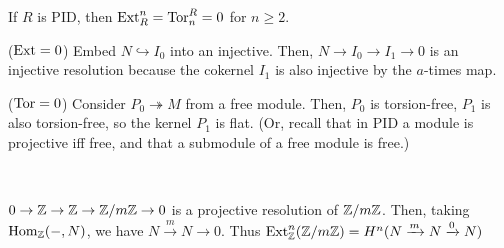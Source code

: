 \documentclass{../../small}
\begin{document}
\begin{prop*}[2.4.8]
If $R$ is PID, then $\operatorname{Ext}_R^n=\operatorname{Tor}^R_n=0$ for $n\ge2$.
\end{prop*}
\begin{pf}
($\operatorname{Ext}=0$)
Embed $N\hookrightarrow I_0$ into an injective.
Then, $N\to I_0\to I_1\to0$ is an injective resolution because the cokernel $I_1$ is also injective by the $a$-times map.

($\operatorname{Tor}=0$)
Consider $P_0\twoheadrightarrow M$ from a free module.
Then, $P_0$ is torsion-free, $P_1$ is also torsion-free, so the kernel $P_1$ is flat.
(Or, recall that in PID a module is projective iff free, and that a submodule of a free module is free.)
\end{pf}
\begin{ex*}\,
\begin{parts}
\item $0\to\mathbb{Z}\to\mathbb{Z}\to\mathbb{Z}/m\mathbb{Z}\to0$ is a projective resolution of $\mathbb{Z}/m\mathbb{Z}$.
Then, taking $\operatorname{Hom}_{\mathbb{Z}}(-,N)$, we have $N\xrightarrow{m}N\to0$.
Thus $\operatorname{Ext}_{\mathbb{Z}}^n(\mathbb{Z}/m\mathbb{Z})=H^n(N\xrightarrow{m}N\xrightarrow{0}N)$
\item 
\end{parts}
\end{ex*}
\end{document}
